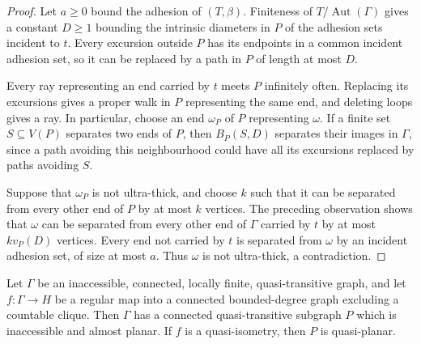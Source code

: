 \documentclass[a4paper]{amsart}
\begin{document}
\begin{proof}
Let $a \geq 0$ bound the adhesion of $(T,\beta)$. Finiteness of $T/\operatorname{Aut}(\Gamma)$ gives a constant $D\geq1$ bounding the intrinsic diameters in $P$ of the adhesion sets incident to $t$. Every excursion outside $P$ has its endpoints in a common incident adhesion set, so it can be replaced by a path in $P$ of length at most $D$.

Every ray representing an end carried by $t$ meets $P$ infinitely often. Replacing its excursions gives a proper walk in $P$ representing the same end, and deleting loops gives a ray. In particular, choose an end $\omega_P$ of $P$ representing $\omega$. If a finite set $S\subseteq V(P)$ separates two ends of $P$, then $B_P(S,D)$ separates their images in $\Gamma$, since a path avoiding this neighbourhood could have all its excursions replaced by paths avoiding $S$.

Suppose that $\omega_P$ is not ultra-thick, and choose $k$ such that it can be separated from every other end of $P$ by at most $k$ vertices. The preceding observation shows that $\omega$ can be separated from every other end of $\Gamma$ carried by $t$ by at most $k v_P(D)$ vertices. Every end not carried by $t$ is separated from $\omega$ by an incident adhesion set, of size at most $a$. Thus $\omega$ is not ultra-thick, a contradiction.
\end{proof}


\begin{lemma}\label{prop:inaccessible-almost-planar-part}
Let $\Gamma$ be an inaccessible, connected, locally finite, quasi-transitive graph, and let $f:\Gamma\to H$ be a regular map into a connected bounded-degree graph excluding a countable clique.
Then $\Gamma$ has a connected quasi-transitive subgraph $P$ which is inaccessible and almost planar.
If $f$ is a quasi-isometry, then $P$ is quasi-planar.
\end{lemma}
\end{document}
